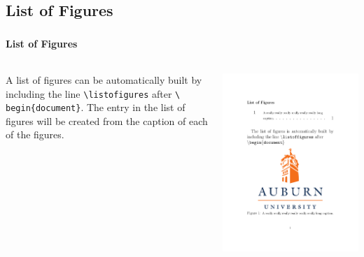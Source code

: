 \documentclass[article]{beamer}
\begin{document}
\subsection{List of Figures}
\begin{frame}
  \frametitle{\thesubsection}
  \framesubtitle{List of Figures}
  \begin{columns}
    \begin{column}{0.5\textwidth}
      A list of figures can be automatically built by including the line
      \texttt{\textbackslash listofigures} after \texttt{\textbackslash
      begin\{document\}}.  The entry in the list of figures will be created
      from the caption of each of the figures.
    \end{column}
    \begin{column}{0.5\textwidth}
      \colorbox{white}{\includegraphics[height=0.9\textheight]{list_of_figures_example.pdf}}
    \end{column}
  \end{columns}
\end{frame}
\end{document}
